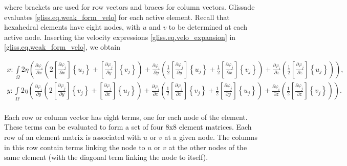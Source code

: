 \noindent
where brackets are used for row vectors and braces for column vectors.
Glissade evaluates \eqref{gliss.eq.weak_form_velo} for each active element.  Recall that hexahedral elements have eight nodes,
with $u$ and $v$ to be determined at each active node.
Inserting the velocity expressions \eqref{gliss.eq.velo_expansion} in \eqref{gliss.eq.weak_form_velo}, we obtain

\begin{equation}
  \label{gliss.eq.element_matrix}
  \begin{split}
    x: \int\limits_{\Omega }{2\eta \left( \frac{\partial {{\varphi }_{i}}}{\partial x}\left( 2\left[ \frac{\partial {{\varphi }_{j}}}{\partial x} \right]\left\{ {{u}_{j}} \right\}+\left[ \frac{\partial {{\varphi }_{j}}}{\partial y} \right]\left\{ {{v}_{j}} \right\} \right)+\frac{\partial {{\varphi }_{i}}}{\partial y}\left( \frac{1}{2}\left[ \frac{\partial {{\varphi }_{j}}}{\partial y} \right]\left\{ {{u}_{j}} \right\}+\frac{1}{2}\left[ \frac{\partial {{\varphi }_{j}}}{\partial x} \right]\left\{ {{v}_{j}} \right\} \right)+\frac{\partial {{\varphi }_{i}}}{\partial z}\left( \frac{1}{2}\left[ \frac{\partial {{\varphi }_{j}}}{\partial z} \right]\left\{ {{u}_{j}} \right\} \right) \right)},  \\
    y: \int\limits_{\Omega }{2\eta \left( \frac{\partial {{\varphi }_{i}}}{\partial y}\left( 2\left[ \frac{\partial {{\varphi }_{j}}}{\partial y} \right]\left\{ {{v}_{j}} \right\}+\left[ \frac{\partial {{\varphi }_{j}}}{\partial x} \right]\left\{ {{u}_{j}} \right\} \right)+\frac{\partial {{\varphi }_{i}}}{\partial x}\left( \frac{1}{2}\left[ \frac{\partial {{\varphi }_{j}}}{\partial x} \right]\left\{ {{v}_{j}} \right\}+\frac{1}{2}\left[ \frac{\partial {{\varphi }_{j}}}{\partial y} \right]\left\{ {{u}_{j}} \right\} \right)+\frac{\partial {{\varphi }_{i}}}{\partial z}\left( \frac{1}{2}\left[ \frac{\partial {{\varphi }_{j}}}{\partial z} \right]\left\{ {{v}_{j}} \right\} \right) \right)}.  \\
  \end{split}
\end{equation}

\noindent
Each row or column vector has eight terms, one for each node of the element.
These terms can be evaluated to form a set of four $8\text{x}8$ element matrices.
Each row of an element matrix is associated with $u$ or $v$ at a given node.  The columns in this row contain terms
linking the node to $u$ or $v$ at the other nodes of the same element (with the diagonal term linking the node to itself).  

